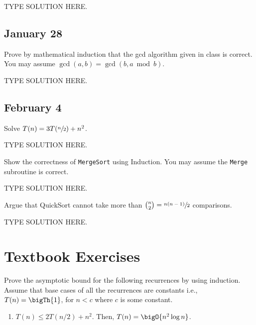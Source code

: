 \documentclass[final]{article}
\begin{document}
\begin{solution}
    TYPE SOLUTION HERE.
\end{solution}

\subsection{January 28}
\begin{question}
    Prove by mathematical induction that the gcd algorithm given in class is correct. You may assume $\gcd(a,b)=\gcd(b, a \bmod b)$.
\end{question}

\begin{solution}
    TYPE SOLUTION HERE.
\end{solution}

\subsection{February 4}
\begin{question}
    Solve $T(n) = 3T(\sfrac{n}{2}) + n^2$.
\end{question}

\begin{solution}
    TYPE SOLUTION HERE.
\end{solution}

\begin{question}
    Show the correctness of \texttt{MergeSort} using Induction. You may assume the \texttt{Merge} subroutine is correct.
\end{question}

\begin{solution}
    TYPE SOLUTION HERE.
\end{solution}

\begin{question}
    Argue that QuickSort cannot take more than $\binom{n}{2} = \sfrac{n(n - 1)}{2}$ comparisons.
\end{question}

\begin{solution}
    TYPE SOLUTION HERE.
\end{solution}

\section{Textbook Exercises}
\begin{exercise}{4.1}
    Prove the asymptotic bound for the following recurrences by using
    induction. Assume that base cases of all the recurrences are
    constants i.e., $ T(n) = \bigTh{1}$, for $n < c$ where $c$ is some
    constant.
    \begin{enumerate}[label=(\alph*)]
        \item $T(n) \leq 2 T(n/2) + n^2$. Then, $T(n) = \bigO{n^2 \log n}$.
    \end{enumerate}
\end{exercise}
\end{document}
